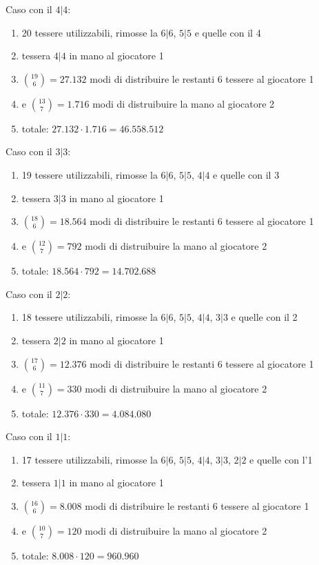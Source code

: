 \documentclass[a4paper,12pt]{report}
\begin{document}
Caso con il \(4|4\):
\begin{enumerate}
    \item 20 tessere utilizzabili, rimosse la \(6|6\), \(5|5\) e quelle con il 4 
    \item tessera \(4|4\) in mano al giocatore 1
    \item \(\binom{19}{6} = 27.132\) modi di distribuire le restanti 6 tessere al giocatore 1
    \item e \(\binom{13}{7} = 1.716\) modi di distruibuire la mano al giocatore 2
    \item totale: \( 27.132 \cdot 1.716 = 46.558.512 \)
\end{enumerate}

Caso con il \(3|3\):
\begin{enumerate}
    \item 19 tessere utilizzabili, rimosse la \(6|6\), \(5|5\), \(4|4\) e quelle con il 3 
    \item tessera \(3|3\) in mano al giocatore 1
    \item \(\binom{18}{6} = 18.564\) modi di distribuire le restanti 6 tessere al giocatore 1
    \item e \(\binom{12}{7} = 792\) modi di distruibuire la mano al giocatore 2
    \item totale: \( 18.564 \cdot 792 = 14.702.688 \)
\end{enumerate}

Caso con il \(2|2\):
\begin{enumerate}
    \item 18 tessere utilizzabili, rimosse la \(6|6\), \(5|5\), \(4|4\), \(3|3\) e quelle con il 2 
    \item tessera \(2|2\) in mano al giocatore 1
    \item \(\binom{17}{6} = 12.376\) modi di distribuire le restanti 6 tessere al giocatore 1
    \item e \(\binom{11}{7} = 330\) modi di distruibuire la mano al giocatore 2
    \item totale: \( 12.376 \cdot 330 = 4.084.080 \)
\end{enumerate}

Caso con il \(1|1\):
\begin{enumerate}
    \item 17 tessere utilizzabili, rimosse la \(6|6\), \(5|5\), \(4|4\), \(3|3\), \(2|2\) e quelle con l'1
    \item tessera \(1|1\) in mano al giocatore 1
    \item \(\binom{16}{6} = 8.008\) modi di distribuire le restanti 6 tessere al giocatore 1
    \item e \(\binom{10}{7} = 120\) modi di distruibuire la mano al giocatore 2
    \item totale: \( 8.008 \cdot 120 = 960.960 \)
\end{enumerate}
\end{document}
